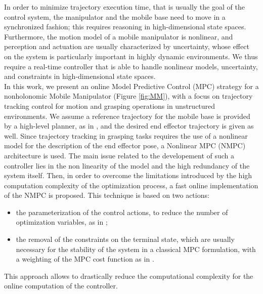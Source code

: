 In order to minimize trajectory execution time, that is usually the goal of the control system, the manipulator and the mobile base need to move in a synchronized fashion; this requires reasoning in high-dimensional state spaces.
Furthermore, the motion model of a mobile manipulator is nonlinear, and perception and actuation are usually characterized by uncertainty, whose effect on the system is particularly important in highly dynamic environments.
We thus require a real-time controller that is able to handle nonlinear models, uncertainty, and constraints in high-dimensional state spaces.\\
In this work, we present an online Model Predictive Control (MPC) strategy for a nonholonomic Mobile Manipulator (Figure \ref{fig:MM}), with a focus on trajectory tracking control for motion and grasping operations in unstructured environments.
We assume a reference trajectory for the mobile base is provided by a high-level planner, as in \cite{thakar2018case,thakar2019icra,kabir2019icra,Rajendran2017}, and the desired end effector trajectory is given as well. Since trajectory tracking in grasping tasks requires the use of a nonlinear model for the description of the end effector pose, a Nonlinear MPC (NMPC) architecture is used. The main issue related to the developement of such a controller lies in the non linearity of the model and the high redundancy of the system itself. Then, in order to overcome the limitations introduced by the high computation complexity of the optimization process, a fast online implementation of the NMPC is proposed. This technique is based on two actions:
\begin{itemize}
	\item the parameterization of the control actions, to reduce the number of optimization variables, as in \cite{Howard2007};
	\item the removal of the constraints on the terminal state, which are usually necessary for the stability of the system in a classical MPC formulation, with a weighting of the MPC cost function as in \cite{alamir2018stability}. 
\end{itemize}
This approach allows to drastically reduce the computational complexity for the online computation of the controller. 

